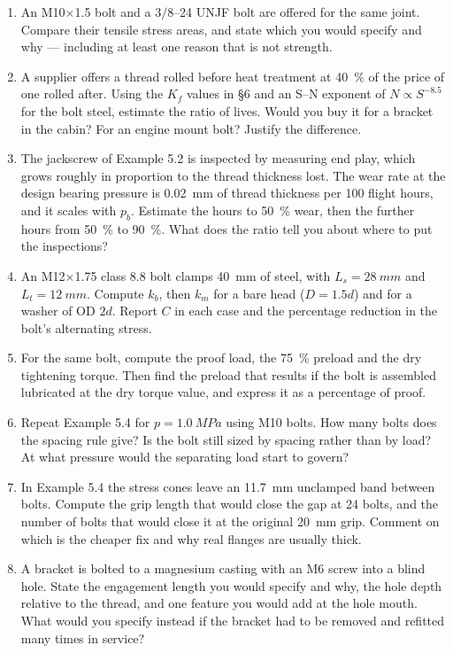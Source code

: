 \documentclass[11pt,a4paper]{article}
\begin{document}
\begin{enumerate}[nosep,leftmargin=1.5em]
  \item An M10$\times$1.5 bolt and a $3/8$--24 UNJF bolt are offered for the same joint. Compare their
        tensile stress areas, and state which you would specify and why --- including at least one
        reason that is not strength.
  \item A supplier offers a thread rolled before heat treatment at \SI{40}{\percent} of the price of
        one rolled after. Using the $K_f$ values in \S6 and an S--N exponent of $N\propto S^{-8.5}$ for
        the bolt steel, estimate the ratio of lives. Would you buy it for a bracket in the cabin? For
        an engine mount bolt? Justify the difference.
  \item The jackscrew of Example 5.2 is inspected by measuring end play, which grows roughly in
        proportion to the thread thickness lost. The wear rate at the design bearing pressure is
        \SI{0.02}{mm} of thread thickness per 100 flight hours, and it scales with $p_b$. Estimate the
        hours to \SI{50}{\percent} wear, then the further hours from \SI{50}{\percent} to
        \SI{90}{\percent}. What does the ratio tell you about where to put the inspections?
  \item An M12$\times$1.75 class 8.8 bolt clamps \SI{40}{mm} of steel, with $L_s=\SI{28}{mm}$ and
        $L_t=\SI{12}{mm}$. Compute $k_b$, then $k_m$ for a bare head ($D=1.5d$) and for a washer of
        OD $2d$. Report $C$ in each case and the percentage reduction in the bolt's alternating stress.
  \item For the same bolt, compute the proof load, the \SI{75}{\percent} preload and the dry
        tightening torque. Then find the preload that results if the bolt is assembled lubricated at
        the dry torque value, and express it as a percentage of proof.
  \item Repeat Example 5.4 for $p=\SI{1.0}{MPa}$ using M10 bolts. How many bolts does the spacing rule
        give? Is the bolt still sized by spacing rather than by load? At what pressure would the
        separating load start to govern?
  \item In Example 5.4 the stress cones leave an \SI{11.7}{mm} unclamped band between bolts. Compute
        the grip length that would close the gap at 24 bolts, and the number of bolts that would close
        it at the original \SI{20}{mm} grip. Comment on which is the cheaper fix and why real flanges
        are usually thick.
  \item A bracket is bolted to a magnesium casting with an M6 screw into a blind hole. State the
        engagement length you would specify and why, the hole depth relative to the thread, and one
        feature you would add at the hole mouth. What would you specify instead if the bracket had to
        be removed and refitted many times in service?
\end{enumerate}
\end{document}
